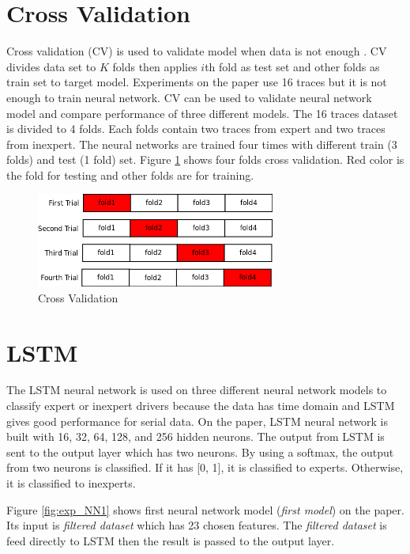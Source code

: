\documentclass[draft,dvipsnames]{drexel-thesis}
\begin{document}
\begin{thesis}
\section{Cross Validation}
Cross validation (CV) is used to validate model when data is not enough \cite{Goodfellow-et-al-2016}. CV divides data set to $K$ folds then applies $i$th fold as test set and other folds as train set to target model. Experiments on the paper use 16 traces but it is not enough to train neural network. CV can be used to validate neural network model and compare performance of three different models. The 16 traces dataset is divided to 4 folds. Each folds contain two traces from expert and two traces from inexpert. The neural networks are trained four times with different train (3 folds) and test (1 fold) set. Figure \ref{fig:CV} shows four folds cross validation. Red color is the fold for testing and other folds are for training.

\begin{figure}[t!]
    \centering
    \includegraphics[width=0.7\textwidth]{pictures/figures/CV.png}
    \caption{Cross Validation}
    \label{fig:CV}
\end{figure}


\section{LSTM}
The LSTM neural network is used on three different neural network models to classify expert or inexpert drivers because the data has time domain and LSTM gives good performance for serial data. On the paper, LSTM neural network is built with 16, 32, 64, 128, and 256 hidden neurons. The output from LSTM is sent to the output layer which has two neurons. By using a softmax, the output from two neurons is classified. If it has [0, 1], it is classified to experts. Otherwise, it is classified to inexperts.

Figure \ref{fig:exp_NN1} shows first neural network model ({\em first model}) on the paper. Its input is {\em filtered dataset} which has 23 chosen features. The {\em filtered dataset} is feed directly to LSTM then the result is passed to the output layer.


\end{thesis}
\end{document}
